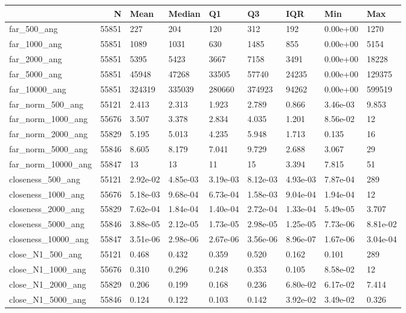 \begin{tabular}{lrlllllll}
\toprule
 & N & Mean & Median & Q1 & Q3 & IQR & Min & Max \\
\midrule
far\_500\_ang & 55851 & 227 & 204 & 120 & 312 & 192 & 0.00e+00 & 1270 \\
far\_1000\_ang & 55851 & 1089 & 1031 & 630 & 1485 & 855 & 0.00e+00 & 5154 \\
far\_2000\_ang & 55851 & 5395 & 5423 & 3667 & 7158 & 3491 & 0.00e+00 & 18228 \\
far\_5000\_ang & 55851 & 45948 & 47268 & 33505 & 57740 & 24235 & 0.00e+00 & 129375 \\
far\_10000\_ang & 55851 & 324319 & 335039 & 280660 & 374923 & 94262 & 0.00e+00 & 599519 \\
far\_norm\_500\_ang & 55121 & 2.413 & 2.313 & 1.923 & 2.789 & 0.866 & 3.46e-03 & 9.853 \\
far\_norm\_1000\_ang & 55676 & 3.507 & 3.378 & 2.834 & 4.035 & 1.201 & 8.56e-02 & 12 \\
far\_norm\_2000\_ang & 55829 & 5.195 & 5.013 & 4.235 & 5.948 & 1.713 & 0.135 & 16 \\
far\_norm\_5000\_ang & 55846 & 8.605 & 8.179 & 7.041 & 9.729 & 2.688 & 3.067 & 29 \\
far\_norm\_10000\_ang & 55847 & 13 & 13 & 11 & 15 & 3.394 & 7.815 & 51 \\
closeness\_500\_ang & 55121 & 2.92e-02 & 4.85e-03 & 3.19e-03 & 8.12e-03 & 4.93e-03 & 7.87e-04 & 289 \\
closeness\_1000\_ang & 55676 & 5.18e-03 & 9.68e-04 & 6.73e-04 & 1.58e-03 & 9.04e-04 & 1.94e-04 & 12 \\
closeness\_2000\_ang & 55829 & 7.62e-04 & 1.84e-04 & 1.40e-04 & 2.72e-04 & 1.33e-04 & 5.49e-05 & 3.707 \\
closeness\_5000\_ang & 55846 & 3.88e-05 & 2.12e-05 & 1.73e-05 & 2.98e-05 & 1.25e-05 & 7.73e-06 & 8.81e-02 \\
closeness\_10000\_ang & 55847 & 3.51e-06 & 2.98e-06 & 2.67e-06 & 3.56e-06 & 8.96e-07 & 1.67e-06 & 3.04e-04 \\
close\_N1\_500\_ang & 55121 & 0.468 & 0.432 & 0.359 & 0.520 & 0.162 & 0.101 & 289 \\
close\_N1\_1000\_ang & 55676 & 0.310 & 0.296 & 0.248 & 0.353 & 0.105 & 8.58e-02 & 12 \\
close\_N1\_2000\_ang & 55829 & 0.206 & 0.199 & 0.168 & 0.236 & 6.80e-02 & 6.17e-02 & 7.414 \\
close\_N1\_5000\_ang & 55846 & 0.124 & 0.122 & 0.103 & 0.142 & 3.92e-02 & 3.49e-02 & 0.326 \\

\end{tabular}
